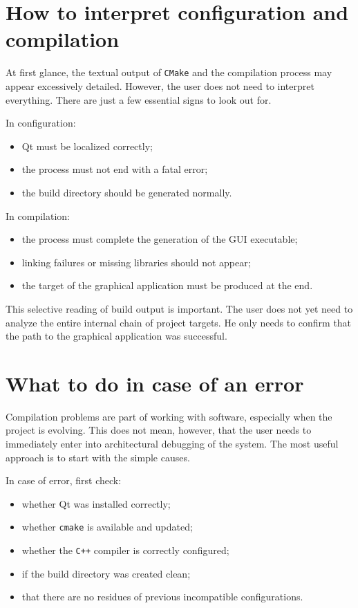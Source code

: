 \section{How to interpret configuration and compilation}
\label{sec:cap2_como_interpretar_configuracao_compilacao}

At first glance, the textual output of \texttt{CMake} and the compilation process may appear excessively detailed. However, the user does not need to interpret everything. There are just a few essential signs to look out for.

In configuration:
\begin{itemize}
\item Qt must be localized correctly;
\item the process must not end with a fatal error;
\item the build directory should be generated normally.
\end{itemize}

In compilation:
\begin{itemize}
\item the process must complete the generation of the GUI executable;
\item linking failures or missing libraries should not appear;
\item the target of the graphical application must be produced at the end.
\end{itemize}

This selective reading of build output is important. The user does not yet need to analyze the entire internal chain of project targets. He only needs to confirm that the path to the graphical application was successful.

\section{What to do in case of an error}
\label{sec:cap2_o_que_fazer_em_caso_de_erro}

Compilation problems are part of working with software, especially when the project is evolving. This does not mean, however, that the user needs to immediately enter into architectural debugging of the system. The most useful approach is to start with the simple causes.

In case of error, first check:
\begin{itemize}
\item whether Qt was installed correctly;
\item whether \texttt{cmake} is available and updated;
\item whether the \texttt{C++} compiler is correctly configured;
\item if the build directory was created clean;
\item that there are no residues of previous incompatible configurations.
\end{itemize}

